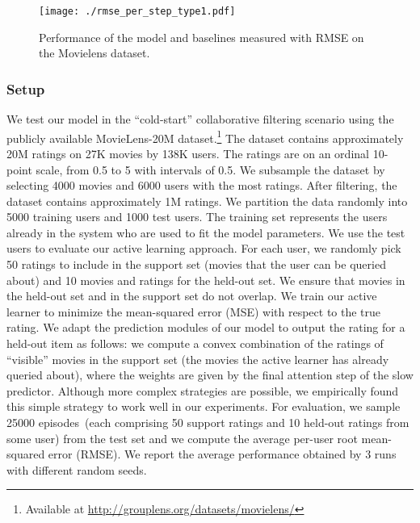 
\begin{figure}[t]
\begin{center}
\texttt{[image: ./rmse\_per\_step\_type1.pdf]}
\caption{Performance of the model and baselines measured with RMSE on the Movielens dataset.}
\label{fig:mlens_plot}
\end{center}
\vspace{-0.5cm}
\end{figure}

\subsubsection{Setup}
We test our model in the ``cold-start'' collaborative filtering scenario using the publicly available MovieLens-20M dataset.\footnote{Available at \url{http://grouplens.org/datasets/movielens/}}
The dataset contains approximately 20M ratings on 27K movies by 138K users. The ratings are on an ordinal 10-point scale, from 0.5 to 5 with intervals of 0.5. We subsample the dataset by selecting 4000 movies and 6000 users with the most ratings. After filtering, the dataset contains approximately 1M ratings. We partition the data randomly into 5000 training users and 1000 test users. The training set represents the users already in the system who are used to fit the model parameters. We use the test users to evaluate our active learning approach. For each user, we randomly pick 50 ratings to include in the support set (movies that the user can be queried about) and 10 movies and ratings for the held-out set. We ensure that movies in the held-out set and in the support set do not overlap. We train our active learner to minimize the mean-squared error (MSE) with respect to the true rating. We adapt the prediction modules of our model to output the rating for a held-out item as follows: we compute a convex combination of the ratings of ``visible'' movies in the support set (the movies the active learner has already queried about), where the weights are given by the final attention step of the slow predictor. Although more complex strategies are possible, we empirically found this simple strategy to work well in our experiments. 
For evaluation, we sample 25000 episodes~(each comprising 50 support ratings and 10 held-out ratings from some user) from the test set and we compute the average per-user root mean-squared error (RMSE). We report the average performance obtained by 3 runs with different random seeds.

